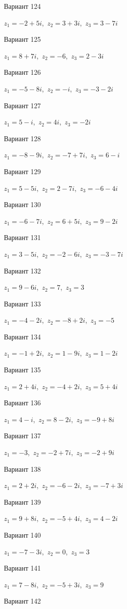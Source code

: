 \documentclass[11pt]{report}
\begin{document}
Вариант 124

$z_1 = -2 + 5 i$,\ $z_2 = 3 + 3 i$,\ $z_3 = 3 - 7 i$

Вариант 125

$z_1 = 8 + 7 i$,\ $z_2 = -6$,\ $z_3 = 2 - 3 i$

Вариант 126

$z_1 = -5 - 8 i$,\ $z_2 = - i$,\ $z_3 = -3 - 2 i$

Вариант 127

$z_1 = 5 - i$,\ $z_2 = 4 i$,\ $z_3 = - 2 i$

Вариант 128

$z_1 = -8 - 9 i$,\ $z_2 = -7 + 7 i$,\ $z_3 = 6 - i$

Вариант 129

$z_1 = 5 - 5 i$,\ $z_2 = 2 - 7 i$,\ $z_3 = -6 - 4 i$

Вариант 130

$z_1 = -6 - 7 i$,\ $z_2 = 6 + 5 i$,\ $z_3 = 9 - 2 i$

Вариант 131

$z_1 = 3 - 5 i$,\ $z_2 = -2 - 6 i$,\ $z_3 = -3 - 7 i$

Вариант 132

$z_1 = 9 - 6 i$,\ $z_2 = 7$,\ $z_3 = 3$

Вариант 133

$z_1 = -4 - 2 i$,\ $z_2 = -8 + 2 i$,\ $z_3 = -5$

Вариант 134

$z_1 = -1 + 2 i$,\ $z_2 = 1 - 9 i$,\ $z_3 = 1 - 2 i$

Вариант 135

$z_1 = 2 + 4 i$,\ $z_2 = -4 + 2 i$,\ $z_3 = 5 + 4 i$

Вариант 136

$z_1 = 4 - i$,\ $z_2 = 8 - 2 i$,\ $z_3 = -9 + 8 i$

Вариант 137

$z_1 = -3$,\ $z_2 = -2 + 7 i$,\ $z_3 = -2 + 9 i$

Вариант 138

$z_1 = 2 + 2 i$,\ $z_2 = -6 - 2 i$,\ $z_3 = -7 + 3 i$

Вариант 139

$z_1 = 9 + 8 i$,\ $z_2 = -5 + 4 i$,\ $z_3 = 4 - 2 i$

Вариант 140

$z_1 = -7 - 3 i$,\ $z_2 = 0$,\ $z_3 = 3$

Вариант 141

$z_1 = 7 - 8 i$,\ $z_2 = -5 + 3 i$,\ $z_3 = 9$

Вариант 142
\end{document}
